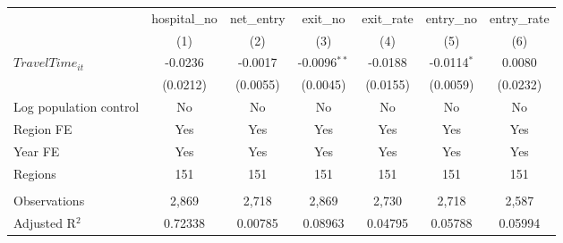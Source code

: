 \begingroup
\centering
\begin{tabular}{lcccccc}
   \toprule
                          & hospital\_no  & net\_entry  & exit\_no       & exit\_rate  & entry\_no     & entry\_rate \\    
                          & (1)           & (2)         & (3)            & (4)         & (5)           & (6)\\  
   \midrule 
   $TravelTime_{it}$      & -0.0236       & -0.0017     & -0.0096$^{**}$ & -0.0188     & -0.0114$^{*}$ & 0.0080\\   
                          & (0.0212)      & (0.0055)    & (0.0045)       & (0.0155)    & (0.0059)      & (0.0232)\\   
   Log population control & No            & No          & No             & No          & No            & No\\  
   Region FE              & Yes           & Yes         & Yes            & Yes         & Yes           & Yes\\  
   Year FE                & Yes           & Yes         & Yes            & Yes         & Yes           & Yes\\  
   Regions                & 151           & 151         & 151            & 151         & 151           & 151\\  
    \\
   Observations           & 2,869         & 2,718       & 2,869          & 2,730       & 2,718         & 2,587\\  
   Adjusted R$^2$         & 0.72338       & 0.00785     & 0.08963        & 0.04795     & 0.05788       & 0.05994\\  
   \bottomrule
\end{tabular}
\par\endgroup
